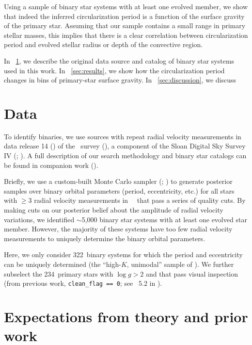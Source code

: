 \documentclass[modern, letterpaper]{aastex62}
\newcommand{\apogee}{\project{\acronym{APOGEE}}}
\newcommand{\sdssiv}{\project{\acronym{SDSS-IV}}}
\newcommand{\DR}{\acronym{DR14}}
\newcommand{\logg}{\ensuremath{\log g}}
\newcommand{\nunimodal}{322}
\newcommand{\nclean}{234}
\begin{document}
Using a sample of binary star systems with at least one evolved member, we show
that indeed the inferred circularization period is a function of the surface
gravity of the primary star.
Assuming that our sample contains a small range in primary stellar masses, this
implies that there is a clear correlation between circularization period and
evolved stellar radius or depth of the convective region.

In \sectionname~\ref{sec:data}, we describe the original data source and catalog
of binary star systems used in this work.
In \sectionname~\ref{sec:results}, we show how the circularization period changes in bins of primary-star surface gravity.
In \sectionname~\ref{sec:discussion}, we discuss 

\section{Data} \label{sec:data}

To identify binaries, we use sources with repeat radial velocity measurements in
data release 14 (\DR) of the \apogee\ survey
(\citealt{Majewski:2017,Abolfathi:2017}), a component of the Sloan Digital Sky
Survey IV (\sdssiv; \citealt{Gunn:2006,Blanton:2017}).
A full description of our search methodology and binary star catalogs can be
found in companion work (\citealt{Price-Whelan:2018}).

Briefly, we use a custom-built Monte Carlo sampler (;
\citealt{Price-Whelan:2017}) to generate posterior samples over binary orbital
parameters (period, eccentricity, etc.) for all stars with $\geq 3$ radial
velocity measurements in \apogee\ \DR\ that pass a series of quality cuts.
By making cuts on our posterior belief about the amplitude of radial velocity
variations, we identified $\sim$5,000 binary star systems with at least one
evolved star member.
However, the majority of these systems have too few radial velocity measurements
to uniquely determine the binary orbital parameters.

Here, we only consider \nunimodal\ binary systems for which the period and
eccentricity can be uniquely determined (the ``high-$K$, unimodal'' sample of
\citealt{Price-Whelan:2018}).
We further subselect the \nclean\ primary stars with $\logg > 2$ and that pass
visual inspection (from previous work, \texttt{clean\_flag == 0}; see
\sectionname~5.2 in \citealt{Price-Whelan:2018}).

\section{Expectations from theory and prior work}
\label{sec:theory}
\end{document}
